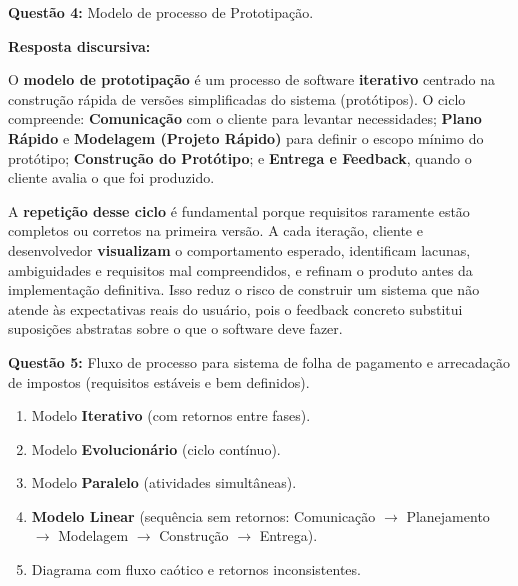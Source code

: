 \documentclass[12pt,a4paper]{article}
\begin{document}
\vspace{0.6cm}

\textbf{Questão 4:} Modelo de processo de Prototipação.

\begin{tcolorbox}[respostabox]
\textbf{Resposta discursiva:}

O \textbf{modelo de prototipação} é um processo de software \textbf{iterativo} centrado na construção rápida de versões simplificadas do sistema (protótipos). O ciclo compreende: \textbf{Comunicação} com o cliente para levantar necessidades; \textbf{Plano Rápido} e \textbf{Modelagem (Projeto Rápido)} para definir o escopo mínimo do protótipo; \textbf{Construção do Protótipo}; e \textbf{Entrega e Feedback}, quando o cliente avalia o que foi produzido.

A \textbf{repetição desse ciclo} é fundamental porque requisitos raramente estão completos ou corretos na primeira versão. A cada iteração, cliente e desenvolvedor \textbf{visualizam} o comportamento esperado, identificam lacunas, ambiguidades e requisitos mal compreendidos, e refinam o produto antes da implementação definitiva. Isso reduz o risco de construir um sistema que não atende às expectativas reais do usuário, pois o feedback concreto substitui suposições abstratas sobre o que o software deve fazer.
\end{tcolorbox}

\vspace{0.6cm}

\textbf{Questão 5:} Fluxo de processo para sistema de folha de pagamento e arrecadação de impostos (requisitos estáveis e bem definidos).

\begin{enumerate}[label=\textbf{\Alph*)}, itemsep=0.3cm]
    \item Modelo \textbf{Iterativo} (com retornos entre fases).
    \item Modelo \textbf{Evolucionário} (ciclo contínuo).
    \item Modelo \textbf{Paralelo} (atividades simultâneas).
    \item[\textbf{D)}] \textbf{Modelo Linear} (sequência sem retornos: Comunicação $\rightarrow$ Planejamento $\rightarrow$ Modelagem $\rightarrow$ Construção $\rightarrow$ Entrega). \checkmark
    \item Diagrama com fluxo caótico e retornos inconsistentes.
\end{enumerate}
\end{document}
